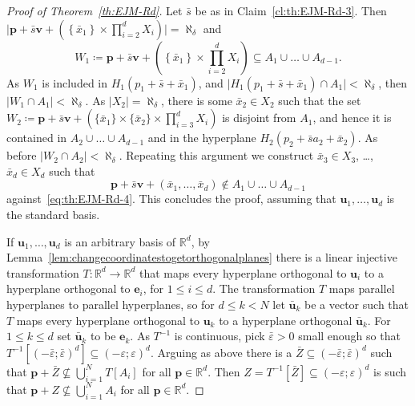 \documentclass[12pt]{amsart}
\newcommand{\R}{\mathbb{R}}	%
\newcommand{\set}[1]{\mathopen \{ {#1} \mathclose \}} %
\newcommand{\setLR}[1]{\left \{ {#1} \right \}} %
\newcommand{\card}[1]{\mathopen | #1 \mathclose |}		%
\theoremstyle{plain}
\theoremstyle{definition}
\theoremstyle{remark}
\begin{document}
\begin{proof}[Proof of Theorem~\ref{th:EJM-Rd}]
Let \( \bar{s} \) be as in Claim~\ref{cl:th:EJM-Rd-3}.
Then \( \card{ \mathbf{p} + \bar{s} \mathbf{v} + ( \setLR{ \bar{x}_1 } \times \prod_{ i = 2 }^d X_i ) } = \aleph_ \delta \) and 
\begin{equation}\label{eq:th:EJM-Rd-4}
 W_1 \coloneqq \mathbf{p} + \bar{s} \mathbf{v} + ( \setLR{ \bar{x}_1 } \times \textstyle \prod_{ i = 2 }^d X_i ) \subseteq A_1 \cup \dots \cup A_{ d - 1 } .
\end{equation}
As \( W_1 \) is included in \( H_1 ( p_1 + \bar{s} + \bar{x}_1 ) \), and \( \card{ H_1 ( p_1 + \bar{s} + \bar{x}_1 ) \cap A_1 } < \aleph_ \delta \), then \( \card{ W_1 \cap A_1 } < \aleph_ \delta \). 
As \( \card{ X_2 } = \aleph_ \delta \), there is some \( \bar{x}_2 \in X_2 \) such that the set \( W_2 \coloneqq \mathbf{p} + \bar{s} \mathbf{v} + ( \set{ \bar{x}_1 } \times \set{ \bar{x}_2 } \times \prod_{ i = 3 }^d X_i) \) is disjoint from \( A_1 \), and hence it is contained in \( A_2 \cup \dots \cup A_{d - 1 } \) and in the hyperplane \( H_2 ( p_2 + \bar{s} a_2 + \bar{x}_2 ) \). 
As before \( \card{ W_2 \cap A_2 } < \aleph_ \delta \). 
Repeating this argument we construct \( \bar{x}_3 \in X_3 \), \ldots , \( \bar{x}_d \in X_d \) such that 
\[
\mathbf{p} + \bar{s} \mathbf{v} + ( \bar{x}_1 , \dots , \bar{x}_d ) \notin A_1 \cup \dots \cup A_{ d - 1 }
\]
against~\eqref{eq:th:EJM-Rd-4}.
This concludes the proof, assuming that \( \mathbf{u}_1 , \dots , \mathbf{u}_d \) is the standard basis.

If \( \mathbf{u}_1 , \dots , \mathbf{u}_d \) is an arbitrary basis of \( \R^d \), by Lemma~\ref{lem:changecoordinatestogetorthogonalplanes} there is a linear injective transformation \( T \colon \R^d \to \R^d \) that maps every hyperplane orthogonal to \( \mathbf{u}_i \) to a hyperplane orthogonal to \( \mathbf{e}_i \), for \( 1 \leq i \leq d \).
The transformation \( T \) maps parallel hyperplanes to parallel hyperplanes, so for \( d \leq k < N \) let \( \bar{\mathbf{u}}_k \) be a vector such that \( T \) maps every hyperplane orthogonal to \( \mathbf{u}_k \) to a hyperplane orthogonal \( \bar{\mathbf{u}}_k \).
For \( 1 \leq k \leq d \) set \( \bar{\mathbf{u}}_k \) to be \( \mathbf{e}_k \).
As \( T^{- 1 } \) is continuous, pick \( \bar{ \varepsilon } > 0 \) small enough so that \( T^{- 1 } [ ( - \bar{ \varepsilon } ; \bar{ \varepsilon } )^d ] \subseteq ( - \varepsilon ; \varepsilon )^d \).
Arguing as above there is a \( \bar{Z} \subseteq ( - \bar{ \varepsilon } ; \bar{ \varepsilon } )^d \) such that \( \mathbf{p} + \bar{Z} \nsubseteq \bigcup_{ i = 1 }^N T [ A_i ] \) for all \( \mathbf{p} \in \R^d \).
Then \( Z = T^{-1} [ \bar{Z} ] \subseteq ( - \varepsilon ; \varepsilon )^d \) is such that \( \mathbf{p} + Z \nsubseteq \bigcup_{ i = 1 }^N A_i \) for all \( \mathbf{p} \in \R^d \).
\end{proof}
\end{document}

